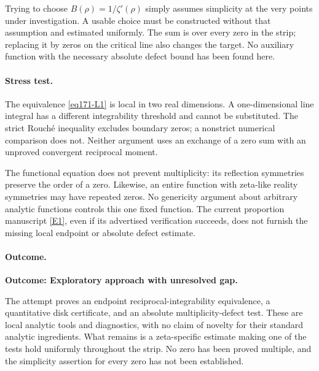 \documentclass[11pt,a4paper]{article}
\newcommand{\eref}[2]{\hyperlink{extra:#1:#2}{[E#2]}}
\numberwithin{equation}{section}
\begin{document}
Trying to choose $B(\rho)=1/\zeta'(\rho)$ simply assumes simplicity at the
very points under investigation. A usable choice must be constructed
without that assumption and estimated uniformly. The sum is over every
zero in the strip; replacing it by zeros on the critical line also changes
the target. No auxiliary function with the necessary absolute defect bound
has been found here.

\paragraph{Stress test.}
The equivalence \eqref{eq171-L1} is local in two real dimensions. A
one-dimensional line integral has a different integrability threshold and
cannot be substituted. The strict Rouch\'e inequality excludes boundary
zeros; a nonstrict numerical comparison does not. Neither argument uses
an exchange of a zero sum with an unproved convergent reciprocal moment.

The functional equation does not prevent multiplicity: its reflection
symmetries preserve the order of a zero. Likewise, an entire function with
zeta-like reality symmetries may have repeated zeros. No genericity argument
about arbitrary analytic functions controls this one fixed function.
The current proportion manuscript \eref{statement}{1}, even if its advertised
verification succeeds, does not furnish the missing local endpoint or
absolute defect estimate.

\paragraph{Outcome.}
\textbf{Outcome: Exploratory approach with unresolved gap.}

The attempt proves an endpoint reciprocal-integrability equivalence, a
quantitative disk certificate, and an absolute multiplicity-defect test.
These are local analytic tools and diagnostics, with no claim of novelty
for their standard analytic ingredients. What remains is a zeta-specific
estimate making one of the tests hold uniformly throughout the strip.
No zero has been proved multiple, and the simplicity assertion for every
zero has not been established.
\end{document}
